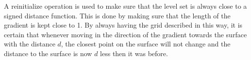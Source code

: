 A reinitialize operation is used to make sure that the level set is always close to a signed distance function. 
This is done by making sure that the length of the gradient is kept close to 1.
By always having the grid described in this way, it is certain that whenever moving in the direction of the gradient towards the surface with the distance $d$, the closest point on the surface will not change and the distance to the surface is now $d$ less then it was before.
